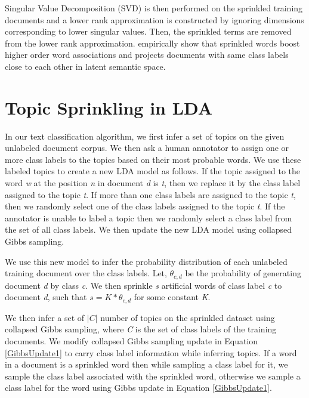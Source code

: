\documentclass[11pt]{article}
\begin{document}
Singular Value Decomposition (SVD) is then performed on the sprinkled training documents and a lower rank approximation is constructed by ignoring dimensions corresponding to lower singular values. Then, the sprinkled terms are removed from the lower rank approximation. \cite{DBLP:conf/ecir/ChakrabortiLWW06} empirically show that sprinkled words boost higher order word associations and projects documents with same class labels close to each other in latent semantic space.
\section{Topic Sprinkling in LDA}
In our text classification algorithm, we first infer a set of topics on the given unlabeled document corpus. We then ask a human annotator to assign one or more class labels to the topics based on their most probable words. We use these labeled topics to create a new LDA model as follows. If the topic assigned to the word \textit{w} at the position \textit{n} in document \textit{d} is \textit{t}, then we replace it by the class label assigned to the topic \textit{t}. If more than one class labels are assigned to the topic \textit{t}, then we randomly select one of the class labels assigned to the topic \textit{t}. If the annotator is unable to label a topic then we randomly select a class label from the set of all class labels. We then update the new LDA model using collapsed Gibbs sampling.%

We use this new model to infer the probability distribution of each unlabeled training document over the class labels. Let, $\theta_{c,d}$ be the probability of generating document \textit{d} by class \textit{c}. We then sprinkle \textit{s} artificial words of class label \textit{c} to document \textit{d}, such that $s=K*\theta_{c,d}$ for some constant \textit{K}.

We then infer a set of $|C|$ number of topics on the sprinkled dataset using collapsed Gibbs sampling, where  \textit{C} is the set of class labels of the training documents. We modify collapsed Gibbs sampling update in Equation \ref{GibbsUpdate1} to carry class label information while inferring topics. If a word in a document is a sprinkled word then while sampling a class label for it, we sample the class label associated with the sprinkled word, otherwise we sample a class label for the word using Gibbs update in Equation \ref{GibbsUpdate1}.
\end{document}
